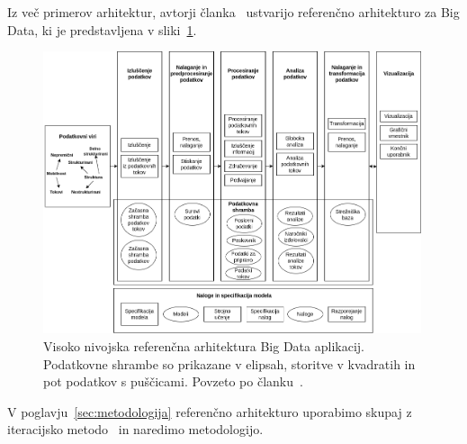 \noindent Iz več primerov arhitektur, avtorji članka~\cite{reference_architecture_classification_technologies}
ustvarijo referenčno arhitekturo za Big Data, ki je predstavljena v sliki~\ref{fig:arch-ref-article}.

\begin{figure}[H]
    \centering
    \includegraphics[width=0.99\textwidth]{img/arhitektura/reference.png}
    \caption{Visoko nivojska referenčna arhitektura Big Data aplikacij.
        Podatkovne shrambe so prikazane v elipsah, storitve v kvadratih in
        pot podatkov s puščicami.
        Povzeto po članku~\cite{reference_architecture_classification_technologies}.}
    \label{fig:arch-ref-article}
\end{figure}

\noindent V poglavju~\ref{sec:metodologija} referenčno arhitekturo uporabimo skupaj z
iteracijsko metodo~\cite{iterative_methodology} in
naredimo metodologijo.